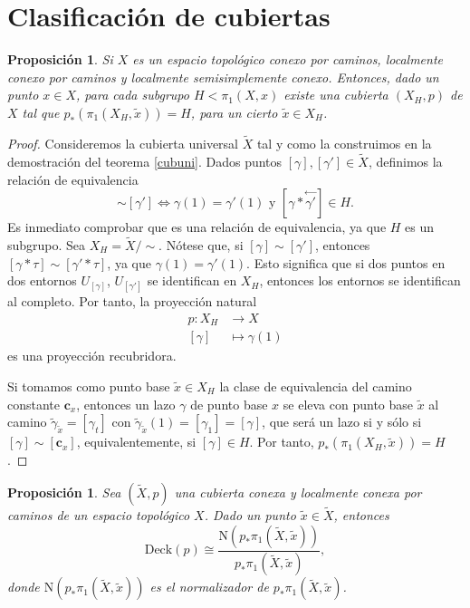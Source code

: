 \documentclass[12pt,a4paper]{book}
\newtheorem{prop}[thm]{Proposición}
\theoremstyle{definition} \newtheorem{defn}[thm]{Definición}
\theoremstyle{definition} \newtheorem{ejemplo}[thm]{Ejemplo}
\theoremstyle{definition} \newtheorem{ejercicio}[thm]{Ejercicio}
\theoremstyle{remark} \newtheorem*{obs}{Observación}
\def\cc{\mathbf{c}}
\def\gf{\pi_1}
\def\XX{\tilde{X}}
\def\xx{\tilde{x}}
\def\DD{\mathrm{Deck}}
\def\NN{\mathrm{N}}
\newcommand\cev[1]{\overset{\leftarrow}{#1}}
\begin{document}
\section{Clasificación de cubiertas}
\begin{prop}\label{cubsubg}
  Si $X$ es un espacio topológico conexo por caminos, localmente conexo por caminos y localmente semisimplemente conexo. Entonces, dado un punto $x\in X$, para cada subgrupo $H<\gf(X,x)$ existe una cubierta $(X_H,p)$ de $X$ tal que $p_*(\gf(X_H,\xx))=H$, para un cierto  $\xx \in X_H$.
\end{prop}
\begin{proof}
  Consideremos la cubierta universal $\XX$ tal y como la construimos en la demostración del teorema \ref{cubuni}. Dados puntos $[\gamma],[\gamma']\in \XX$, definimos la relación de equivalencia
  \begin{equation*}
    [\gamma]\sim[\gamma'] \Leftrightarrow \gamma(1)=\gamma'(1) \text{ y } [\gamma*\cev{\gamma'}]\in H.
  \end{equation*}
  Es inmediato comprobar que es una relación de equivalencia, ya que $H$ es un subgrupo. Sea $X_H=\XX/\sim$. Nótese que, si $[\gamma]\sim [\gamma']$, entonces $[\gamma*\tau]\sim [\gamma'*\tau]$, ya que $\gamma(1)=\gamma'(1)$. Esto significa que si dos puntos en dos entornos $U_{[\gamma]}$, $U_{[\gamma']}$ se identifican en $X_H$, entonces los entornos se identifican al completo. Por tanto, la proyección natural 
  \begin{align*}
    p :X_H&\longrightarrow X\\ 
    [\gamma] &\longmapsto \gamma(1) 
    \end{align*}
    es una proyección recubridora.

    Si tomamos como punto base $\xx\in X_H$ la clase de equivalencia del camino constante $\cc_{x}$, entonces un lazo $\gamma$ de punto base $x$ se eleva con punto base $\xx$ al camino $\tilde{\gamma}_{\xx}=[\gamma_t]$ con $\tilde{\gamma}_{\xx}(1)=[\gamma_1]=[\gamma]$, que será un lazo si y sólo si $[\gamma]\sim[\cc_x]$, equivalentemente, si $[\gamma]\in H$. Por tanto, $p_*(\gf(X_H,\xx))=H$.
\end{proof}
\begin{prop}
  Sea $(\XX,p)$ una cubierta conexa y localmente conexa por caminos de un espacio topológico $X$. Dado un punto $\xx\in \XX$, entonces
  \begin{equation*}
    \DD(p)\cong \frac{\NN(p_*\gf(\XX,\xx))}{p_*\gf(\XX,\xx)},
  \end{equation*}
  donde $\NN(p_*\gf(\XX,\xx))$ es el normalizador de $p_*\gf(\XX,\xx)$.
\end{prop}
\end{document}
